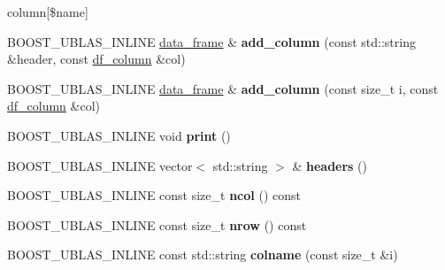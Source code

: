  column\mbox{[}\$name\mbox{]} \begin{DoxyCompactItemize}
\item 
B\+O\+O\+S\+T\+\_\+\+U\+B\+L\+A\+S\+\_\+\+I\+N\+L\+I\+NE \hyperlink{classboost_1_1numeric_1_1ublas_1_1data__frame}{data\+\_\+frame} \& {\bfseries add\+\_\+column} (const std\+::string \&header, const \hyperlink{classboost_1_1numeric_1_1ublas_1_1df__column}{df\+\_\+column} \&col)\hypertarget{classboost_1_1numeric_1_1ublas_1_1data__frame_a8f67aa27f8f340e8bfd42ce0f7713be0}{}\label{classboost_1_1numeric_1_1ublas_1_1data__frame_a8f67aa27f8f340e8bfd42ce0f7713be0}

\item 
B\+O\+O\+S\+T\+\_\+\+U\+B\+L\+A\+S\+\_\+\+I\+N\+L\+I\+NE \hyperlink{classboost_1_1numeric_1_1ublas_1_1data__frame}{data\+\_\+frame} \& {\bfseries add\+\_\+column} (const size\+\_\+t i, const \hyperlink{classboost_1_1numeric_1_1ublas_1_1df__column}{df\+\_\+column} \&col)\hypertarget{classboost_1_1numeric_1_1ublas_1_1data__frame_a487209ed44384e2999d6a407160276e6}{}\label{classboost_1_1numeric_1_1ublas_1_1data__frame_a487209ed44384e2999d6a407160276e6}

\item 
B\+O\+O\+S\+T\+\_\+\+U\+B\+L\+A\+S\+\_\+\+I\+N\+L\+I\+NE void {\bfseries print} ()\hypertarget{classboost_1_1numeric_1_1ublas_1_1data__frame_a2aae0aa66a1eadc3301b40cd104596c1}{}\label{classboost_1_1numeric_1_1ublas_1_1data__frame_a2aae0aa66a1eadc3301b40cd104596c1}

\item 
B\+O\+O\+S\+T\+\_\+\+U\+B\+L\+A\+S\+\_\+\+I\+N\+L\+I\+NE vector$<$ std\+::string $>$ \& {\bfseries headers} ()\hypertarget{classboost_1_1numeric_1_1ublas_1_1data__frame_aff5e603e988e7b710a3df6104d706c12}{}\label{classboost_1_1numeric_1_1ublas_1_1data__frame_aff5e603e988e7b710a3df6104d706c12}

\item 
B\+O\+O\+S\+T\+\_\+\+U\+B\+L\+A\+S\+\_\+\+I\+N\+L\+I\+NE const size\+\_\+t {\bfseries ncol} () const \hypertarget{classboost_1_1numeric_1_1ublas_1_1data__frame_adf7817e6cf0dcc7fa6d892a351b5c9a8}{}\label{classboost_1_1numeric_1_1ublas_1_1data__frame_adf7817e6cf0dcc7fa6d892a351b5c9a8}

\item 
B\+O\+O\+S\+T\+\_\+\+U\+B\+L\+A\+S\+\_\+\+I\+N\+L\+I\+NE const size\+\_\+t {\bfseries nrow} () const \hypertarget{classboost_1_1numeric_1_1ublas_1_1data__frame_a7f773294cbd41d890b5469e2a85abd32}{}\label{classboost_1_1numeric_1_1ublas_1_1data__frame_a7f773294cbd41d890b5469e2a85abd32}

\item 
B\+O\+O\+S\+T\+\_\+\+U\+B\+L\+A\+S\+\_\+\+I\+N\+L\+I\+NE const std\+::string {\bfseries colname} (const size\+\_\+t \&i)\hypertarget{classboost_1_1numeric_1_1ublas_1_1data__frame_abda7571a20f64b31d627d3fb2f7956fb}{}\label{classboost_1_1numeric_1_1ublas_1_1data__frame_abda7571a20f64b31d627d3fb2f7956fb}

\end{DoxyCompactItemize}


